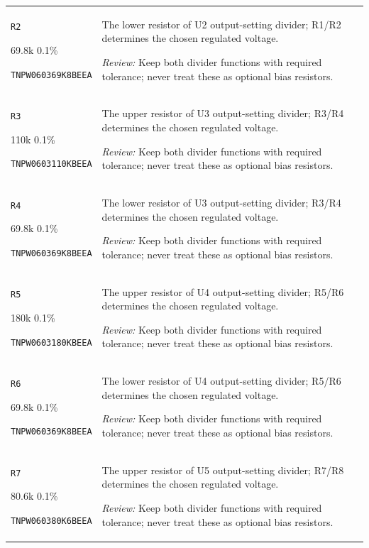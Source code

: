 \documentclass[10pt,a4paper]{article}
\begin{document}
\begin{longtable}{@{}P{46mm}P{117mm}@{}}
\nolinkurl{R2}\par 69.8k 0.1\%\par\scriptsize \nolinkurl{TNPW060369K8BEEA} & The lower resistor of U2 output-setting divider; R1/R2 determines the chosen regulated voltage.\par\smallskip\textit{Review:} Keep both divider functions with required tolerance; never treat these as optional bias resistors. \\
\nolinkurl{R3}\par 110k 0.1\%\par\scriptsize \nolinkurl{TNPW0603110KBEEA} & The upper resistor of U3 output-setting divider; R3/R4 determines the chosen regulated voltage.\par\smallskip\textit{Review:} Keep both divider functions with required tolerance; never treat these as optional bias resistors. \\
\nolinkurl{R4}\par 69.8k 0.1\%\par\scriptsize \nolinkurl{TNPW060369K8BEEA} & The lower resistor of U3 output-setting divider; R3/R4 determines the chosen regulated voltage.\par\smallskip\textit{Review:} Keep both divider functions with required tolerance; never treat these as optional bias resistors. \\
\nolinkurl{R5}\par 180k 0.1\%\par\scriptsize \nolinkurl{TNPW0603180KBEEA} & The upper resistor of U4 output-setting divider; R5/R6 determines the chosen regulated voltage.\par\smallskip\textit{Review:} Keep both divider functions with required tolerance; never treat these as optional bias resistors. \\
\nolinkurl{R6}\par 69.8k 0.1\%\par\scriptsize \nolinkurl{TNPW060369K8BEEA} & The lower resistor of U4 output-setting divider; R5/R6 determines the chosen regulated voltage.\par\smallskip\textit{Review:} Keep both divider functions with required tolerance; never treat these as optional bias resistors. \\
\nolinkurl{R7}\par 80.6k 0.1\%\par\scriptsize \nolinkurl{TNPW060380K6BEEA} & The upper resistor of U5 output-setting divider; R7/R8 determines the chosen regulated voltage.\par\smallskip\textit{Review:} Keep both divider functions with required tolerance; never treat these as optional bias resistors. \\

\end{longtable}
\end{document}
